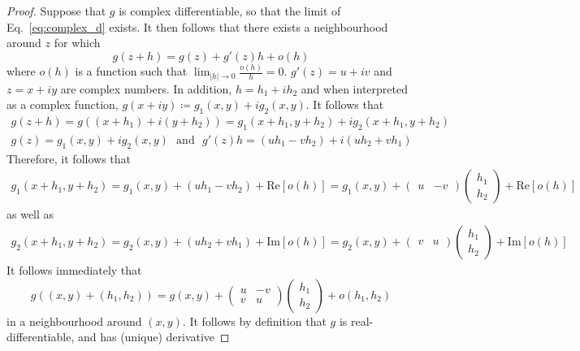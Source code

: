 \documentclass[aps,pra,showpacs,notitlepage,onecolumn,superscriptaddress,nofootinbib]{revtex4-1}
\theoremstyle{definition}
\begin{document}
\begin{proof}
  Suppose that $g$ is complex differentiable, so that the limit of Eq.~\eqref{eq:complex_d} exists. It then follows that there exists a neighbourhood
  around $z$ for which
  \begin{equation}
    \label{eq:complex_der}
    g(z + h) = g(z) + g'(z) h + o(h)
  \end{equation}
  where $o(h)$ is a function such that $\lim_{|h| \to 0} \frac{o(h)}{h} = 0$. $g'(z) = u + i v$ and $z = x + iy$ are complex numbers. In addition, $h = h_1 + i h_2$ and when interpreted as a complex function,
  $g(x + iy) \coloneqq g_1(x, y) + i g_2(x, y)$. It follows that
  \begin{align}
    g(z + h) = g\left( (x + h_1) + i(y + h_2) \right) = g_1(x + h_1, y + h_2) + i g_2(x + h_1, y + h_2) \\
    g(z) = g_1(x, y) + i g_2(x, y) \ \ \ \text{and} \ \ \ g'(z) h = (u h_1 - v h_2) + i (u h_2 + v h_1)
  \end{align}
  Therefore, it follows that
  \begin{align}
    g_1(x + h_1, y + h_2) = g_1(x, y) + (u h_1 - v h_2) + \text{Re}[o(h)] = g_1(x, y) + \begin{pmatrix} u & -v \end{pmatrix} \begin{pmatrix} h_1 \\ h_2 \end{pmatrix} + \text{Re}[o(h)]
  \end{align}
  as well as
  \begin{align}
    g_2(x + h_1, y + h_2) = g_2(x, y) + (u h_2 + v h_1) + \text{Im}[o(h)] = g_2(x, y) + \begin{pmatrix} v & u \end{pmatrix} \begin{pmatrix} h_1 \\ h_2 \end{pmatrix} + \text{Im}[o(h)]
  \end{align}
  It follows immediately that
  \begin{equation}
    g((x, y) + (h_1, h_2)) = g(x, y) + \begin{pmatrix} u & -v \\ v & u \end{pmatrix} \begin{pmatrix} h_1 \\ h_2 \end{pmatrix} + o(h_1, h_2)
  \end{equation}
  in a neighbourhood around $(x, y)$. It follows by definition that $g$ is real-differentiable, and has (unique) derivative

\end{proof}
\end{document}
